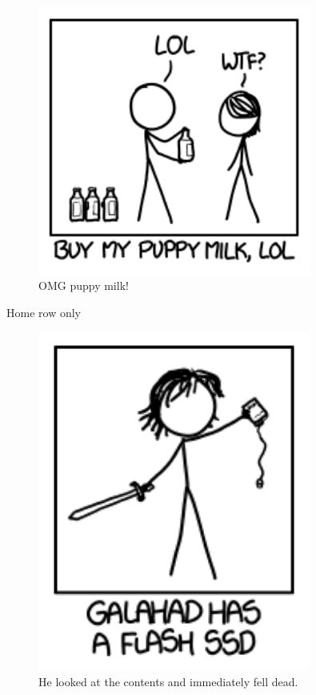 {\begin{figure}[!htbp]
\centering
\includegraphics[scale=0.5, max width=0.8\textwidth]{imgs/a/75/t9_milk.png}
\caption{OMG puppy milk!}
\end{figure}

{Home row only}

\begin{figure}[!htbp]
\centering
\includegraphics[scale=0.5, max width=0.8\textwidth]{imgs/a/75/t9_galahad.png}
\caption{He looked at the contents and immediately fell dead.}
\end{figure}

}
